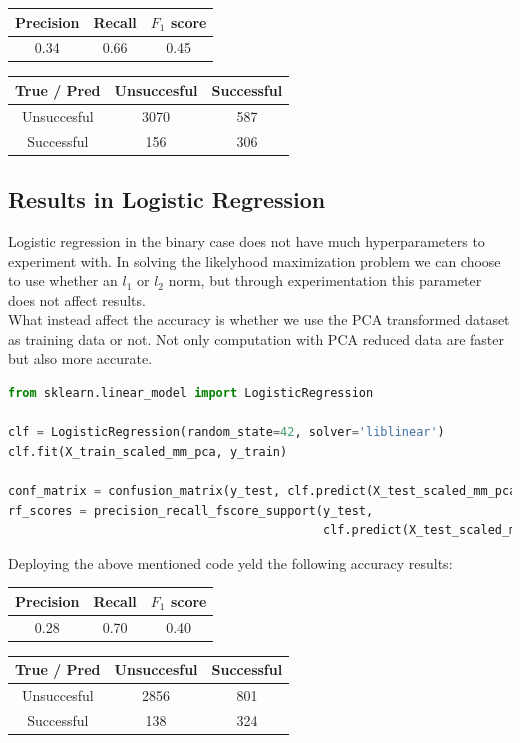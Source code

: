 \begin{center}
    \begin{tabular}{|c|c|c|}
        \hline
        Precision & Recall & \(F_1\) score \\
        \hline
        0.34 & 0.66 & 0.45 \\
        \hline
    \end{tabular}
    \quad     
    \begin{tabular}{|c|c|c|}
        \hline
         True / Pred & Unsuccesful & Successful \\
        \hline
        Unsuccesful & 3070 & 587 \\
        \hline
        Successful & 156 & 306\\
        \hline
    \end{tabular}
\end{center}
\subsection{Results in Logistic Regression}
Logistic regression in the binary case does not have much hyperparameters to experiment with. In solving the likelyhood maximization problem we can choose to use whether an \(l_1\) or \(l_2\) norm, but through experimentation this parameter does not affect results. \\
What instead affect the accuracy is whether we use the PCA transformed dataset as training data or not. Not only computation with PCA reduced data are faster but also more accurate. 

\begin{lstlisting}[language=Python, caption= Deploying logistic regression]
from sklearn.linear_model import LogisticRegression

clf = LogisticRegression(random_state=42, solver='liblinear')
clf.fit(X_train_scaled_mm_pca, y_train)

conf_matrix = confusion_matrix(y_test, clf.predict(X_test_scaled_mm_pca))
rf_scores = precision_recall_fscore_support(y_test,
                                            clf.predict(X_test_scaled_mm_pca))
\end{lstlisting}
Deploying the above mentioned code yeld the following accuracy results:
\begin{center}
    \begin{tabular}{|c|c|c|}
        \hline
        Precision & Recall & \(F_1\) score \\
        \hline
        0.28 & 0.70 & 0.40 \\
        \hline
    \end{tabular}
    \quad     
    \begin{tabular}{|c|c|c|}
        \hline
         True / Pred & Unsuccesful & Successful \\
        \hline
        Unsuccesful & 2856 & 801 \\
        \hline
        Successful & 138 & 324\\
        \hline
    \end{tabular}
\end{center}

